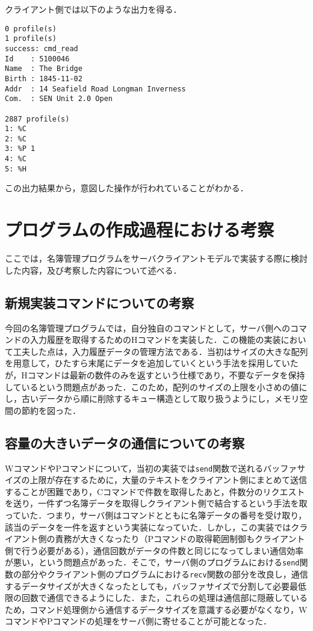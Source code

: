 \documentclass[11pt]{jsarticle}
\begin{document}
クライアント側では以下のような出力を得る．

\begin{verbatim}
0 profile(s)
1 profile(s)
success: cmd_read
Id    : 5100046
Name  : The Bridge
Birth : 1845-11-02
Addr  : 14 Seafield Road Longman Inverness
Com.  : SEN Unit 2.0 Open

2887 profile(s)
1: %C
2: %C
3: %P 1
4: %C
5: %H
\end{verbatim}

この出力結果から，意図した操作が行われていることがわかる．

\section{プログラムの作成過程における考察}

ここでは，名簿管理プログラムをサーバクライアントモデルで実装する際に検討した内容，及び考察した内容について述べる．

\subsection{新規実装コマンドについての考察}

今回の名簿管理プログラムでは，自分独自のコマンドとして，サーバ側へのコマンドの入力履歴を取得するためのHコマンドを実装した．この機能の実装において工夫した点は，入力履歴データの管理方法である．当初はサイズの大きな配列を用意して，ひたすら末尾にデータを追加していくという手法を採用していたが，Hコマンドは最新の数件のみを返すという仕様であり，不要なデータを保持しているという問題点があった．このため，配列のサイズの上限を小さめの値にし，古いデータから順に削除するキュー構造として取り扱うようにし，メモリ空間の節約を図った．

\subsection{容量の大きいデータの通信についての考察}

WコマンドやPコマンドについて，当初の実装では{\tt send}関数で送れるバッファサイズの上限が存在するために，大量のテキストをクライアント側にまとめて送信することが困難であり，Cコマンドで件数を取得したあと，件数分のリクエストを送り，一件ずつ名簿データを取得しクライアント側で結合するという手法を取っていた．つまり，サーバ側はコマンドとともに名簿データの番号を受け取り，該当のデータを一件を返すという実装になっていた．しかし，この実装ではクライアント側の責務が大きくなったり（Pコマンドの取得範囲制御もクライアント側で行う必要がある），通信回数がデータの件数と同じになってしまい通信効率が悪い，という問題点があった．そこで，サーバ側のプログラムにおける{\tt send}関数の部分やクライアント側のプログラムにおける{\tt recv}関数の部分を改良し，通信するデータサイズが大きくなったとしても，バッファサイズで分割して必要最低限の回数で通信できるようにした．また，これらの処理は通信部に隠蔽しているため，コマンド処理側から通信するデータサイズを意識する必要がなくなり，WコマンドやPコマンドの処理をサーバ側に寄せることが可能となった．
\end{document}

